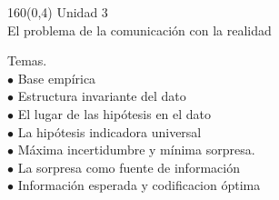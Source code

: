 \documentclass[shownotes,aspectratio=169]{beamer}
\begin{document}
\begin{frame}
\begin{textblock}{160}(0,4) \centering
\Large Unidad 3 \\
\LARGE El problema de la comunicación con la realidad
\end{textblock}
\vspace{1.7cm}


{\Large Temas.} \\[0.2cm]

$\bullet$ Base empírica \\
$\bullet$ Estructura invariante del dato \\
$\bullet$ El lugar de las hipótesis en el dato \\
$\bullet$ La hipótesis indicadora universal \\
$\bullet$ Máxima incertidumbre y mínima sorpresa. \\
$\bullet$ La sorpresa como fuente de información \\
$\bullet$ Información esperada y codificacion óptima \\

\end{frame}
\end{document}
